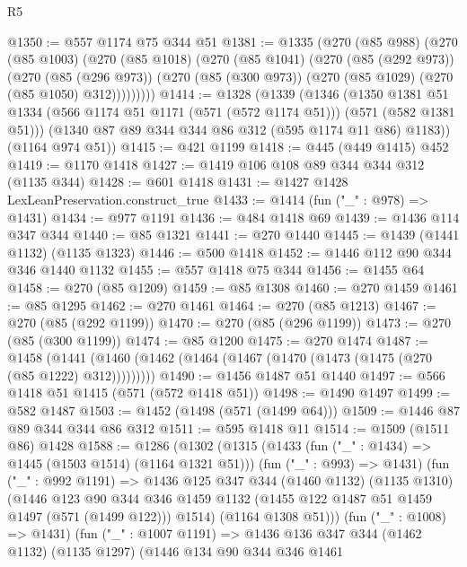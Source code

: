\begin{lexlean}{R5}
\begin{coremodule}
@1350 := @557 @1174 @75 @344 @51
@1381 := @1335
    (@270
      (@85 @988)
      (@270
        (@85 @1003)
        (@270
          (@85 @1018)
          (@270
            (@85 @1041)
            (@270
              (@85 (@292 @973))
              (@270
                (@85 (@296 @973))
                (@270 (@85 (@300 @973)) (@270 (@85 @1029) (@270 (@85 @1050) @312)))))))))
@1414 := @1328
    (@1339
      (@1346
        (@1350
          @1381
          @51
          @1334
          (@566 @1174 @51 @1171 (@571 (@572 @1174 @51)))
          (@571 (@582 @1381 @51)))
        (@1340 @87 @89 @344 @344 @86 @312 (@595 @1174 @11 @86) @1183))
      (@1164 @974 @51))
@1415 := @421 @1199
@1418 := @445 (@449 @1415) @452
@1419 := @1170 @1418
@1427 := @1419 @106 @108 @89 @344 @344 @312 (@1135 @344)
@1428 := @601 @1418
@1431 := @1427 @1428 LexLeanPreservation.construct_true
@1433 := @1414 (fun ("_" : @978) => @1431)
@1434 := @977 @1191
@1436 := @484 @1418 @69
@1439 := @1436 @114 @347 @344
@1440 := @85 @1321
@1441 := @270 @1440
@1445 := @1439 (@1441 @1132) (@1135 @1323)
@1446 := @500 @1418
@1452 := @1446 @112 @90 @344 @346 @1440 @1132
@1455 := @557 @1418 @75 @344
@1456 := @1455 @64
@1458 := @270 (@85 @1209)
@1459 := @85 @1308
@1460 := @270 @1459
@1461 := @85 @1295
@1462 := @270 @1461
@1464 := @270 (@85 @1213)
@1467 := @270 (@85 (@292 @1199))
@1470 := @270 (@85 (@296 @1199))
@1473 := @270 (@85 (@300 @1199))
@1474 := @85 @1200
@1475 := @270 @1474
@1487 := @1458
    (@1441 (@1460 (@1462 (@1464 (@1467 (@1470 (@1473 (@1475 (@270 (@85 @1222) @312)))))))))
@1490 := @1456 @1487 @51 @1440
@1497 := @566 @1418 @51 @1415 (@571 (@572 @1418 @51))
@1498 := @1490 @1497
@1499 := @582 @1487
@1503 := @1452 (@1498 (@571 (@1499 @64)))
@1509 := @1446 @87 @89 @344 @344 @86 @312
@1511 := @595 @1418 @11
@1514 := @1509 (@1511 @86) @1428
@1588 := @1286
    (@1302
      (@1315
        (@1433 (fun ("_" : @1434) => @1445 (@1503 @1514) (@1164 @1321 @51)))
        (fun ("_" : @993) => @1431)
        (fun ("_" : @992 @1191) =>
        @1436
          @125
          @347
          @344
          (@1460 @1132)
          (@1135 @1310)
          (@1446
            @123
            @90
            @344
            @346
            @1459
            @1132
            (@1455 @122 @1487 @51 @1459 @1497 (@571 (@1499 @122)))
            @1514)
          (@1164 @1308 @51)))
      (fun ("_" : @1008) => @1431)
      (fun ("_" : @1007 @1191) =>
      @1436
        @136
        @347
        @344
        (@1462 @1132)
        (@1135 @1297)
        (@1446
          @134
          @90
          @344
          @346
          @1461

\end{coremodule}
\end{lexlean}
